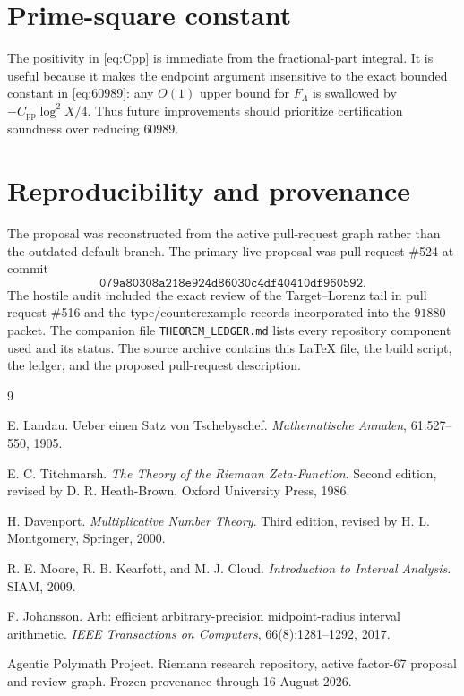 \documentclass[11pt]{article}
\theoremstyle{definition}
\theoremstyle{remark}
\newcommand{\1}{\mathbf 1}
\begin{document}
\section{Prime-square constant}\label{app:pp}

The positivity in \eqref{eq:Cpp} is immediate from the fractional-part integral.  It is useful because it makes the endpoint argument insensitive to the exact bounded constant in \eqref{eq:60989}: any \(O(1)\) upper bound for \(F_\Lambda\) is swallowed by \(-C_{\mathrm{pp}}\log^2X/4\).  Thus future improvements should prioritize certification soundness over reducing \(60989\).

\section{Reproducibility and provenance}\label{app:provenance}

The proposal was reconstructed from the active pull-request graph rather than the outdated default branch.  The primary live proposal was pull request \#524 at commit
\[
\texttt{079a80308a218e924d86030c4df40410df960592}.
\]
The hostile audit included the exact review of the Target--Lorenz tail in pull request \#516 and the type/counterexample records incorporated into the \(91880\) packet.  The companion file \texttt{THEOREM\_LEDGER.md} lists every repository component used and its status.  The source archive contains this \LaTeX{} file, the build script, the ledger, and the proposed pull-request description.

\begin{thebibliography}{9}

E. Landau.
\newblock Ueber einen Satz von Tschebyschef.
\newblock \emph{Mathematische Annalen}, 61:527--550, 1905.

E. C. Titchmarsh.
\newblock \emph{The Theory of the Riemann Zeta-Function}.
\newblock Second edition, revised by D. R. Heath-Brown, Oxford University Press, 1986.

H. Davenport.
\newblock \emph{Multiplicative Number Theory}.
\newblock Third edition, revised by H. L. Montgomery, Springer, 2000.

R. E. Moore, R. B. Kearfott, and M. J. Cloud.
\newblock \emph{Introduction to Interval Analysis}.
\newblock SIAM, 2009.

F. Johansson.
\newblock Arb: efficient arbitrary-precision midpoint-radius interval arithmetic.
\newblock \emph{IEEE Transactions on Computers}, 66(8):1281--1292, 2017.

Agentic Polymath Project.
\newblock Riemann research repository, active factor-67 proposal and review graph.
\newblock Frozen provenance through 16 August 2026.

\end{thebibliography}
\end{document}
